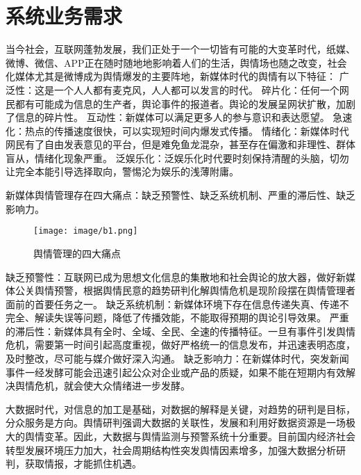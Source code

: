 \section{系统业务需求}
当今社会，互联网蓬勃发展，我们正处于一个一切皆有可能的大变革时代，纸媒、微博、微信、APP正在随时随地地影响着人们的生活，舆情场也随之改变，社会化媒体尤其是微博成为舆情爆发的主要阵地，新媒体时代的舆情有以下特征：
广泛性：这是一个人人都有麦克风，人人都可以发言的时代。
碎片化：任何一个网民都有可能成为信息的生产者，舆论事件的报道者。舆论的发展呈网状扩散，加剧了信息的碎片性。
互动性：新媒体可以满足更多人的参与意识和表达愿望。
急速化：热点的传播速度很快，可以实现短时间内爆发式传播。
情绪化：新媒体时代网民有了自由发表意见的平台，但是难免鱼龙混杂，甚至存在偏激和非理性、群体盲从，情绪化现象严重。
泛娱乐化：泛娱乐化时代要时刻保持清醒的头脑，切勿让完全本能引导选择取向，警惕沦为娱乐的浅薄附庸。

新媒体舆情管理存在四大痛点：缺乏预警性、缺乏系统机制、严重的滞后性、缺乏影响力。
\begin{figure}[!htb]
	\centering
	\texttt{[image: image/b1.png]}
	\caption{舆情管理的四大痛点}
\end{figure}
缺乏预警性：互联网已成为思想文化信息的集散地和社会舆论的放大器，做好新媒体公关舆情预警，根据舆情民意的趋势研判化解舆情危机是现阶段摆在舆情管理者面前的首要任务之一。
缺乏系统机制：新媒体环境下存在信息传递失真、传递不完全、解读失误等问题，降低了传播效能，不能取得预期的舆论引导效果。
严重的滞后性：新媒体具有全时、全域、全民、全速的传播特征。一旦有事件引发舆情危机，需要第一时间引起高度重视，做好严格统一的信息发布，并迅速表明态度，及时整改，尽可能与媒介做好深入沟通。
缺乏影响力：在新媒体时代，突发新闻事件一经发酵可能会迅速引起公众对企业或产品的质疑，如果不能在短期内有效解决舆情危机，就会使大众情绪进一步发酵。

大数据时代，对信息的加工是基础，对数据的解释是关键，对趋势的研判是目标，分众服务是方向。舆情研判强调大数据的关联性，发展和利用好数据资源是一场极大的舆情变革。因此，大数据与舆情监测与预警系统十分重要。目前国内经济社会转型发展环境压力加大，社会周期结构性突发舆情因素增多，加强大数据分析研判，获取情报，才能抓住机遇。
